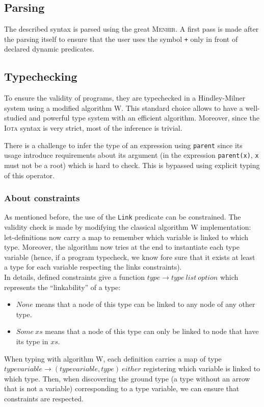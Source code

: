 \documentclass[10pt,a4paper]{article}
\newcommand\Iota{\textsc{Iota}}
\newcommand\Menhir{\textsc{Menhir}}
\newcommand{\ocaml}{\texttt}
\begin{document}
\subsection{Parsing}
The described syntax is parsed using the great \Menhir{}\cite{menhir}. A first pass is made after the parsing itself to ensure that the user uses the symbol \ocaml{+} only in front of declared dynamic predicates.

\subsection{Typechecking}
To ensure the validity of programs, they are typechecked in a Hindley-Milner system\cite{hindley} using a modified algorithm W\cite{milner}.
This standard choice allows to have a well-studied and powerful type system with an efficient algorithm. Moreover, since the \Iota{} syntax is very strict, most of the inference is trivial.

There is a challenge to infer the type of an expression using \ocaml{parent} since its usage introduce requirements about its argument (in the expression \ocaml{parent(x)}, \ocaml{x} must not be a root) which is hard to check. This is bypassed using explicit typing of this operator.

\subsubsection{About constraints}
As mentioned before, the use of the \ocaml{Link} predicate can be constrained. The validity check is made by modifying the classical algorithm W implementation: let-definitions now carry a map to remember which variable is linked to which type. Moreover, the algorithm now tries at the end to instantiate each type variable (hence, if a program typecheck, we know fore sure that it exists at least a type for each variable respecting the links constraints).\\
In details, defined constraints give a function $type \to type\ list\ option$ which represents the ``linkability'' of a type:
\begin{itemize}
\item $None$ means that a node of this type can be linked to any node of any other type.
\item $Some\ xs$ means that a node of this type can only be linked to node that have its type in $xs$.
\end{itemize}
When typing with algorithm W, each definition carries a map of type $typevariable \to (typevariable, type)\ either$ registering which variable is linked to which type. Then, when discovering the ground type (a type without an arrow that is not a variable) corresponding to a type variable, we can ensure that constraints are respected.
\end{document}
